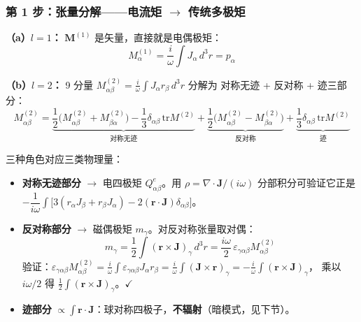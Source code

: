 \subsubsection{第 1 步：张量分解——电流矩 $\to$ 传统多极矩}

\textbf{（a）$l=1$：} $\mathbf{M}^{(1)}$ 是矢量，直接就是电偶极矩：
\begin{equation}
  M^{(1)}_\alpha = \frac{i}{\omega}\int J_\alpha\,d^3r = p_\alpha
\end{equation}

\textbf{（b）$l=2$：} 9 分量 $M^{(2)}_{\alpha\beta}=\frac{i}{\omega}\int J_\alpha r_\beta\,d^3r$ 分解为
对称无迹 + 反对称 + 迹三部分：
\begin{equation}
  M^{(2)}_{\alpha\beta} = \underbrace{\frac{1}{2}\bigl(M^{(2)}_{\alpha\beta}+M^{(2)}_{\beta\alpha}\bigr)
    - \frac{1}{3}\delta_{\alpha\beta}\,\mathrm{tr}M^{(2)}}_{\text{对称无迹}}
    + \underbrace{\frac{1}{2}\bigl(M^{(2)}_{\alpha\beta}-M^{(2)}_{\beta\alpha}\bigr)}_{\text{反对称}}
    + \underbrace{\frac{1}{3}\delta_{\alpha\beta}\,\mathrm{tr}M^{(2)}}_{\text{迹}}
\end{equation}

三种角色对应三类物理量：

\begin{itemize}
  \item \textbf{对称无迹部分} $\to$ 电四极矩 $Q^e_{\alpha\beta}$。用 $\rho=\nabla\cdot\mathbf{J}/(i\omega)$ 分部积分可验证它正是
    $-\dfrac{1}{i\omega}\int\bigl[3(r_\alpha J_\beta+r_\beta J_\alpha)-2(\mathbf{r}\cdot\mathbf{J})\delta_{\alpha\beta}\bigr]$。
  \item \textbf{反对称部分} $\to$ 磁偶极矩 $m_\gamma$。对反对称张量取对偶：
    \begin{equation}
      m_\gamma = \frac{1}{2}\int(\mathbf{r}\times\mathbf{J})_\gamma\,d^3r
        = \frac{i\omega}{2}\,\varepsilon_{\gamma\alpha\beta}M^{(2)}_{\alpha\beta}
    \end{equation}
    验证：$\varepsilon_{\gamma\alpha\beta}M^{(2)}_{\alpha\beta}
      =\frac{i}{\omega}\int\varepsilon_{\gamma\alpha\beta}J_\alpha r_\beta
      =\frac{i}{\omega}\int(\mathbf{J}\times\mathbf{r})_\gamma
      =-\frac{i}{\omega}\int(\mathbf{r}\times\mathbf{J})_\gamma$，
    乘以 $i\omega/2$ 得 $\frac12\int(\mathbf{r}\times\mathbf{J})_\gamma$。$\checkmark$
  \item \textbf{迹部分} $\propto\int\mathbf{r}\cdot\mathbf{J}$：球对称四极子，\textbf{不辐射}（暗模式，见下节）。
\end{itemize}

